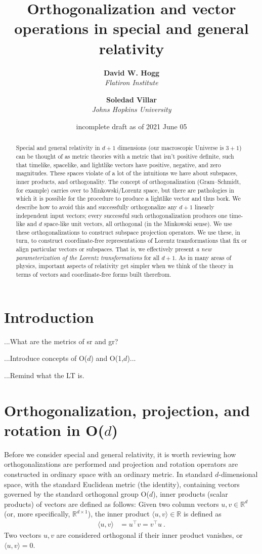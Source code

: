 \documentclass{article}
\title{\bfseries Orthogonalization and vector operations in special and general relativity}
\author{\textbf{David W. Hogg}\\
        \textsl{Flatiron Institute}\\
        \and
        \textbf{Soledad Villar}\\
        \textsl{Johns Hopkins University}}
\date{incomplete draft as of 2021 June 05}
\newcommand{\inner}[2]{\langle{#1},{#2}\rangle}
\begin{document}
\thispagestyle{plain}
\maketitle

\begin{abstract}\noindent
    Special and general relativity in $d+1$ dimensions (our macroscopic Universe is $3+1$) can be thought of as metric theories with a metric that isn't positive definite, such that timelike, spacelike, and lightlike vectors have positive, negative, and zero magnitudes.
    These spaces violate of a lot of the intuitions we have about subspaces, inner products, and orthogonality.
    The concept of orthogonalization (Gram--Schmidt, for example) carries over to Minkowski/Lorentz space, but there are pathologies in which it is possible for the procedure to produce a lightlike vector and thus bork.
    We describe how to avoid this and successfully orthogonalize any $d+1$ linearly independent input vectors; every successful such orthogonalization produces one time-like and $d$ space-like unit vectors, all orthogonal (in the Minkowski sense).
    We use these orthogonalizations to construct subspace projection operators.
    We use these, in turn, to construct coordinate-free representations of Lorentz transformations that fix or align particular vectors or subspaces.
    That is, we effectively present \emph{a new parameterization of the Lorentz transformations} for all $d+1$.
    As in many areas of physics, important aspects of relativity get simpler when we think of the theory in terms of vectors and coordinate-free forms built therefrom.
\end{abstract}

\section{Introduction}

...What are the metrics of sr and gr?

...Introduce concepts of O($d$) and O(1,$d$)...

...Remind what the LT is.

\section{Orthogonalization, projection, and rotation in O($d$)}\label{sec:orth}

Before we consider special and general relativity, it is worth reviewing how orthogonalizations are performed and projection and rotation operators are constructed in ordinary space with an ordinary metric.
In standard $d$-dimensional space, with the standard Euclidean metric (the identity), containing vectors governed by the standard orthogonal group O($d$), inner products (scalar products) of vectors are defined as follows:
Given two column vectors $u,v\in\mathbb{R}^d$ (or, more specifically, $\mathbb{R}^{d\times1}$), the inner product $\inner{u}{v}\in\mathbb{R}$ is defined as
\begin{align}
    \inner{u}{v} &= u^\top v = v^\top u ~.
\end{align}
Two vectors $u,v$ are considered orthogonal if their inner product vanishes, or $\inner{u}{v}=0$.
\end{document}
